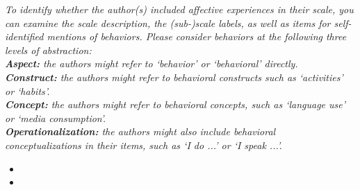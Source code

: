 \documentclass[10pt,a4paper]{protocol}
\begin{document}

\textit{To identify whether the author(s) included affective experiences in their scale, you can examine the scale description, the (sub-)scale labels, as well as items for self-identified mentions of behaviors. Please consider behaviors at the following three levels of abstraction:\\
\textbf{Aspect:} the authors might refer to `behavior' or `behavioral' directly.\\
\textbf{Construct:} the authors might refer to behavioral constructs such as `activities' or `habits'.\\
\textbf{Concept:} the authors might refer to behavioral concepts, such as `language use' or `media consumption'.\\
\textbf{Operationalization:} the authors might also include behavioral conceptualizations in their items, such as `I do ...' or `I speak ...'.}
\vspace{0.5em}
\begin{itemize}
	\item {}
	\item {}
\end{itemize}
\divider

\end{document}
